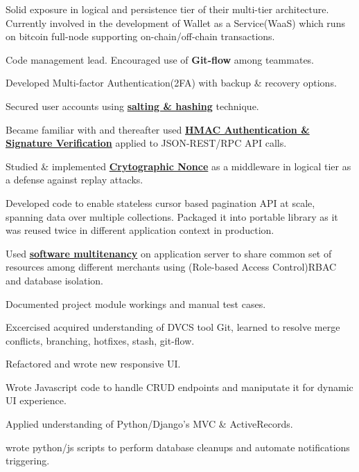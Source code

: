 \documentclass[]{deedy-resume-openfont}
\begin{document}
\begin{minipage}[t]{0.66\textwidth}
\vspace{\topsep} %
\begin{tightemize}
\item  Solid exposure in logical and persistence tier of their multi-tier
  architecture. Currently involved in the development of Wallet as a Service(WaaS)
  which runs on bitcoin full-node supporting on-chain/off-chain transactions.
\item Code management lead. Encouraged use of \textbf{Git-flow} among teammates.
\item Developed Multi-factor Authentication(2FA) with backup \& recovery options.
\item Secured user accounts using \href{http://swlogs.me/blog/user-auth/}{\textbf{salting \& hashing}} technique.
\item Became familiar with and thereafter used  \href{http://swlogs.me/blog/hmac-authentication/}{\textbf{HMAC Authentication \& Signature Verification}} applied to JSON-REST/RPC API calls.
\item Studied \& implemented \href{http://swlogs.me/DIY/nonce-auth-systems/}{\textbf{Crytographic Nonce}}
  as a middleware in logical tier as a defense against replay attacks.
\item Developed code to enable stateless cursor based pagination API at scale, spanning data over multiple
  collections. Packaged it into portable library as it was reused twice in different application context in production.
\item Used \href{http://swlogs.me/DIY/multi-tenancy/}{\textbf{software multitenancy}} on application server to share common set of resources among different merchants using (Role-based Access Control)RBAC and database isolation.
\item Documented project module workings and manual test cases.
\end{tightemize}
\sectionsep

\vspace{\topsep} %
\begin{tightemize}
\item  Excercised acquired understanding of DVCS tool Git, learned to resolve
  merge conflicts, branching, hotfixes, stash, git-flow.
\item Refactored and wrote new responsive UI.
\item Wrote Javascript code to handle CRUD endpoints and maniputate it for dynamic UI experience.
\item Applied understanding of Python/Django's MVC \& ActiveRecords.
\item wrote python/js scripts to perform database cleanups and automate notifications triggering.
\end{tightemize}
\sectionsep




\end{minipage}
\end{document}
